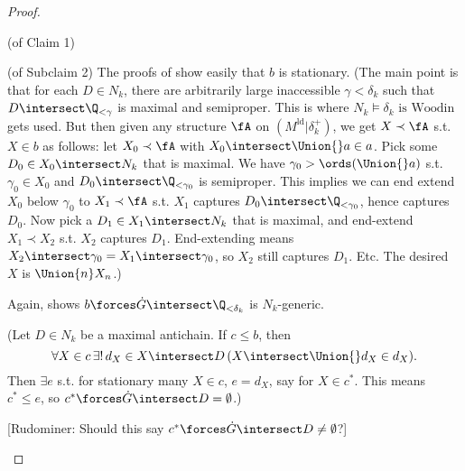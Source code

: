 \documentclass[oneside,12pt]{amsart}
\begin{document}
\begin{proof}
\begin{subproof}{(of Claim 1)}
\begin{subproof}{(of Subclaim 2)}
The proofs of \cite{Larson_Book} show easily that $b$ is stationary. (The main point is that for each $D\in N_k$,
there are arbitrarily large inaccessible $\gamma<\delta_k$ such that $D\intersect\Q_{<\gamma}$ is maximal
and semiproper. This is where $N_k\models \delta_k \text{ is Woodin}$ gets used. But then given any structure $\fA$
on $\left(M^{\text{ld}} \vert \delta_k^+ \right)$, we get $X\prec\fA$ s.t. $X\in b$ as follows:
let $X_0\prec\fA$ with $X_0\intersect \Union{}a\in a$.
Pick some $D_0\in X_0\intersect N_k$ that is maximal.
We have $\gamma_0>\ords(\Union{}a)$ s.t. $\gamma_0\in X_0$ and $D_0\intersect\Q_{<\gamma_0}$
is semiproper. This implies we can end extend $X_0$ below $\gamma_0$ to $X_1\prec\fA$ s.t. $X_1$ captures
$D_0\intersect\Q_{<\gamma_0}$, hence captures $D_0$. Now pick a $D_1\in X_1\intersect N_k$ that is maximal, and
end-extend $X_1\prec X_2$ s.t. $X_2$ captures $D_1$. End-extending means $X_2\intersect\gamma_0 = X_1\intersect \gamma_0$,
so $X_2$ still captures $D_1$. Etc. The desired $X$ is $\Union{n} X_n$.)

Again, \cite{Larson_Book} shows $b\forces \dot{G} \intersect \Q_{<\delta_k}$ is $N_k$-generic.

(Let $D\in N_k$ be a maximal antichain. If $c\leq b$, then
$$\forall X\in c \, \exists! \, d_X \in X\intersect D \, (X\intersect \Union{}d_X\in d_X).$$
Then $\exists e$ s.t. for stationary many
$X\in c$, $e=d_X$, say for $X\in c^*$. This means $c^*\leq e$, so
$c^*\forces \dot{G} \intersect D = \emptyset$.)

[Rudominer: Should this say $c^*\forces \dot{G} \intersect D \not= \emptyset$?]


\end{subproof}

\end{subproof}

\end{proof}




\end{document}
